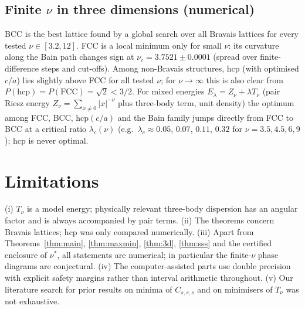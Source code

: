 \documentclass[11pt,a4paper]{amsart}
\theoremstyle{definition}
\begin{document}
\subsection*{Finite $\nu$ in three dimensions (numerical)}
BCC is the best lattice found by a global search over all Bravais lattices for every tested $\nu\in[3.2,12]$. FCC is a local minimum only for small $\nu$: its curvature along the Bain path changes sign at $\nu_c=3.7521\pm0.0001$ (spread over finite-difference steps and cut-offs). Among non-Bravais structures, hcp (with optimised $c/a$) lies slightly above FCC for all tested $\nu$; for $\nu\to\infty$ this is also clear from $P(\mathrm{hcp})=P(\mathrm{FCC})=\sqrt2<3/2$.
For mixed energies $E_\lambda=Z_\nu+\lambda T_\nu$ (pair Riesz energy $Z_\nu=\sum_{x\ne0}|x|^{-\nu}$ plus three-body term, unit density) the optimum among FCC, BCC, hcp$(c/a)$ and the Bain family jumps directly from FCC to BCC at a critical ratio $\lambda_c(\nu)$ (e.g.\ $\lambda_c\approx0.05$, $0.07$, $0.11$, $0.32$ for $\nu=3.5,4.5,6,9$); hcp is never optimal.

\section{Limitations}\label{sec:limits}
(i) $T_\nu$ is a model energy; physically relevant three-body dispersion has an angular factor and is always accompanied by pair terms. (ii) The theorems concern Bravais lattices; hcp was only compared numerically. (iii) Apart from Theorems~\ref{thm:main}, \ref{thm:maxmin}, \ref{thm:3d}, \ref{thm:sss} and the certified enclosure of $\nu^*$, all statements are numerical; in particular the finite-$\nu$ phase diagrams are conjectural. (iv) The computer-assisted parts use double precision with explicit safety margins rather than interval arithmetic throughout. (v) Our literature search for prior results on minima of $C_{s,s,s}$ and on minimisers of $T_\nu$ was not exhaustive.
\end{document}
